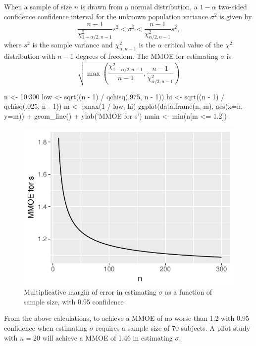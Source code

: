 When a sample of size $n$ is
drawn from a normal distribution, a $1 - \alpha$ two-sided confidence confidence
interval for the unknown population variance $\sigma^2$ is
given by
\begin{equation}
  \frac{n-1}{\chi^{2}_{1-\alpha/2,n-1}} s^{2} < \sigma^{2} <
  \frac{n-1}{\chi^{2}_{\alpha/2,n-1}} s^{2},
  \end{equation}
where $s^2$ is the sample variance and $\chi^{2}_{\alpha,n-1}$ is the
$\alpha$ critical value of the $\chi^2$ distribution with $n-1$
degrees of freedom.  The MMOE for estimating $\sigma$ is
\begin{equation}
  \sqrt{\max(\frac{\chi^{2}_{1-\alpha/2,n-1}}{n-1},
  \frac{n-1}{\chi^{2}_{\alpha/2,n-1}})}
\end{equation}
\begin{Schunk}
\begin{Sinput}
n    <- 10:300
low  <- sqrt((n - 1) / qchisq(.975, n - 1))
hi   <- sqrt((n - 1) / qchisq(.025, n - 1))
m    <- pmax(1 / low, hi)
ggplot(data.frame(n, m), aes(x=n, y=m)) + geom_line() +
  ylab('MMOE for s')
nmin <- min(n[m <= 1.2])
\end{Sinput}
\begin{figure}[htbp]

\centerline{\includegraphics{htest-smmoe-1} }

\caption[Margin of error in estimating $\sigma$]{Multiplicative margin of error in estimating $\sigma$ as a function of sample size, with 0.95 confidence}\label{fig:htest-smmoe}
\end{figure}
\end{Schunk}
From the above calculations, to achieve a MMOE of no worse than 1.2
with 0.95 confidence when estimating $\sigma$ requires a sample size
of 70 subjects.  A pilot study with $n=20$ will achieve a
MMOE of 1.46 in estimating $\sigma$.

